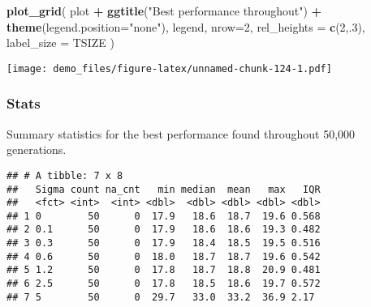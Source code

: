 \documentclass[]{book}
\newenvironment{Shaded}{\begin{snugshade}}{\end{snugshade}}
\newcommand{\DataTypeTok}[1]{\textcolor[rgb]{0.13,0.29,0.53}{#1}}
\newcommand{\DecValTok}[1]{\textcolor[rgb]{0.00,0.00,0.81}{#1}}
\newcommand{\KeywordTok}[1]{\textcolor[rgb]{0.13,0.29,0.53}{\textbf{#1}}}
\newcommand{\NormalTok}[1]{#1}
\newcommand{\OperatorTok}[1]{\textcolor[rgb]{0.81,0.36,0.00}{\textbf{#1}}}
\newcommand{\OtherTok}[1]{\textcolor[rgb]{0.56,0.35,0.01}{#1}}
\newcommand{\StringTok}[1]{\textcolor[rgb]{0.31,0.60,0.02}{#1}}
\begin{document}
\begin{Shaded}
\begin{Highlighting}[]
\KeywordTok{plot_grid}\NormalTok{(}
\NormalTok{  plot }\OperatorTok{+}
\StringTok{    }\KeywordTok{ggtitle}\NormalTok{(}\StringTok{"Best performance throughout"}\NormalTok{) }\OperatorTok{+}
\StringTok{    }\KeywordTok{theme}\NormalTok{(}\DataTypeTok{legend.position=}\StringTok{"none"}\NormalTok{),}
\NormalTok{  legend,}
  \DataTypeTok{nrow=}\DecValTok{2}\NormalTok{,}
  \DataTypeTok{rel_heights =} \KeywordTok{c}\NormalTok{(}\DecValTok{2}\NormalTok{,.}\DecValTok{3}\NormalTok{),}
  \DataTypeTok{label_size =}\NormalTok{ TSIZE}
\NormalTok{)}
\end{Highlighting}
\end{Shaded}

\texttt{[image: demo\_files/figure-latex/unnamed-chunk-124-1.pdf]}

\hypertarget{stats-65}{%
\subsubsection{Stats}\label{stats-65}}

Summary statistics for the best performance found throughout 50,000 generations.

\begin{Shaded}
\end{Shaded}

\begin{verbatim}
## # A tibble: 7 x 8
##   Sigma count na_cnt   min median  mean   max   IQR
##   <fct> <int>  <int> <dbl>  <dbl> <dbl> <dbl> <dbl>
## 1 0        50      0  17.9   18.6  18.7  19.6 0.568
## 2 0.1      50      0  17.9   18.6  18.6  19.3 0.482
## 3 0.3      50      0  17.9   18.4  18.5  19.5 0.516
## 4 0.6      50      0  18.0   18.7  18.7  19.6 0.542
## 5 1.2      50      0  17.8   18.7  18.8  20.9 0.481
## 6 2.5      50      0  17.8   18.5  18.6  19.7 0.572
## 7 5        50      0  29.7   33.0  33.2  36.9 2.17
\end{verbatim}
\end{document}
